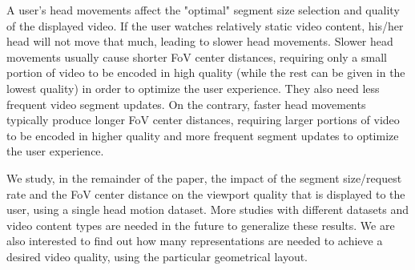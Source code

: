 A user's head movements affect the "optimal" segment size selection and quality of the displayed video. If the user watches relatively static video content, his/her head will not move that much, leading to slower head movements. Slower head movements usually cause shorter FoV center distances, requiring only a small portion of video to be encoded in high quality (while the rest can be given in the lowest quality) in order to optimize the user experience. They also need less frequent video segment updates. On the contrary, faster head movements typically produce longer FoV center distances,  requiring larger portions of video to be encoded in higher quality and more frequent segment updates to optimize the user experience.

We study, in the remainder of the paper, the impact of the segment size/request rate and the FoV center distance on the viewport quality that is displayed to the user, using a single head motion dataset. More studies with different datasets and video content types are needed in the future to generalize these results. We are also interested to find out how many representations are needed to achieve a desired video quality, using the particular geometrical layout.
